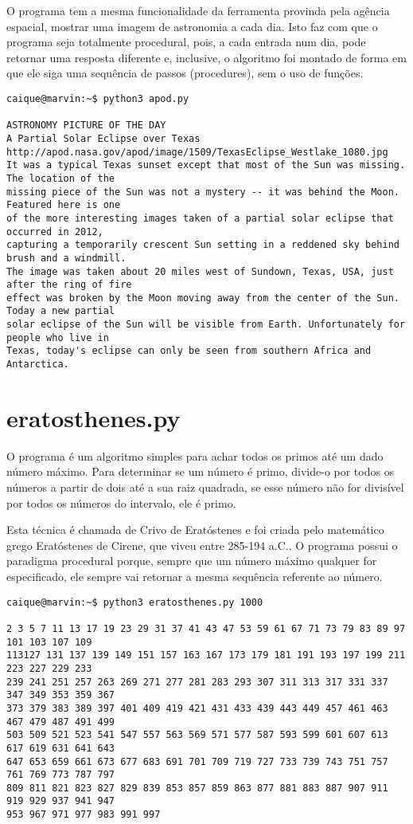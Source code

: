 \documentclass{article}
\begin{document}
\sloppy
O programa tem a mesma funcionalidade da ferramenta provinda pela agência espacial, mostrar uma imagem de astronomia a cada dia. Isto faz com que o programa seja totalmente procedural, pois, a cada entrada num dia, pode retornar uma resposta diferente e, inclusive, o algoritmo foi montado de forma em que ele siga uma sequência de passos (procedures), sem o uso de funções.

\begin{verbatim}
caique@marvin:~$ python3 apod.py 

ASTRONOMY PICTURE OF THE DAY
A Partial Solar Eclipse over Texas
http://apod.nasa.gov/apod/image/1509/TexasEclipse_Westlake_1080.jpg
It was a typical Texas sunset except that most of the Sun was missing. The location of the
missing piece of the Sun was not a mystery -- it was behind the Moon. Featured here is one 
of the more interesting images taken of a partial solar eclipse that occurred in 2012, 
capturing a temporarily crescent Sun setting in a reddened sky behind brush and a windmill.
The image was taken about 20 miles west of Sundown, Texas, USA, just after the ring of fire 
effect was broken by the Moon moving away from the center of the Sun. Today a new partial 
solar eclipse of the Sun will be visible from Earth. Unfortunately for people who live in
Texas, today's eclipse can only be seen from southern Africa and Antarctica.
\end{verbatim}

\section*{eratosthenes.py}
O programa é um algoritmo simples para achar todos os primos até um dado número máximo. Para determinar se um número é primo, divide-o por todos os números a partir de dois até a sua raiz quadrada, se esse número não for divisível por todos os números do intervalo, ele é primo.

Esta técnica é chamada de Crivo de Eratóstenes e foi criada pelo matemático grego Eratóstenes de Cirene, que viveu entre 285-194 a.C.. O programa possui o paradigma procedural porque, sempre que um número máximo qualquer for especificado, ele sempre vai retornar a mesma sequência referente ao número.
\sloppy
\begin{verbatim}caique@marvin:~$ python3 eratosthenes.py 1000

2 3 5 7 11 13 17 19 23 29 31 37 41 43 47 53 59 61 67 71 73 79 83 89 97 101 103 107 109 
113127 131 137 139 149 151 157 163 167 173 179 181 191 193 197 199 211 223 227 229 233 
239 241 251 257 263 269 271 277 281 283 293 307 311 313 317 331 337 347 349 353 359 367 
373 379 383 389 397 401 409 419 421 431 433 439 443 449 457 461 463 467 479 487 491 499
503 509 521 523 541 547 557 563 569 571 577 587 593 599 601 607 613 617 619 631 641 643
647 653 659 661 673 677 683 691 701 709 719 727 733 739 743 751 757 761 769 773 787 797
809 811 821 823 827 829 839 853 857 859 863 877 881 883 887 907 911 919 929 937 941 947 
953 967 971 977 983 991 997 
\end{verbatim}
\end{document}
